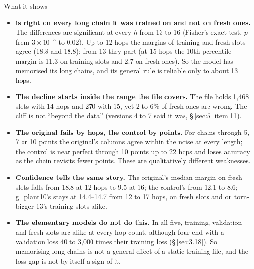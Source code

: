 \documentclass[paper=a4,fontsize=11pt,DIV=11,parskip=half,headings=small,numbers=noendperiod]{scrartcl}
\DeclareRobustCommand{\lead}[1]{\textsf{\bfseries\color{accent}#1}}
\DeclareRobustCommand{\code}[1]{{\fontseries{m}\ttfamily #1}}
\begin{document}
\begin{findbox}{What it shows}
\begin{itemize}
\item \lead{\code{torn-\allowbreak{}bigger-\allowbreak{}13} is right on every long chain it was trained on and
  not on fresh ones.} The differences are significant at every $h$ from 13 to 16 (Fisher’s exact test, $p$ from
  $3\times10^{-5}$ to 0.02). Up to 12 hops the margins of training and fresh slots agree (18.8 and 18.8); from
  13 they part (at 15 hops the 10th-percentile margin is 11.3 on training slots and 2.7 on fresh ones). So the
  model has memorised its long chains, and its general rule is reliable only to about 13 hops.
\item \lead{The decline starts inside the range the file covers.} The file holds 1,468 slots with 14 hops and
  270 with 15, yet 2 to 6\% of fresh ones are wrong. The cliff is not “beyond the data” (versions 4 to 7 said it
  was, \S\,\ref{sec:5} item 11).
\item \lead{The original fails by hops, the control by points.} For chains through 5, 7 or 10 points the
  original’s columns agree within the noise at every length; the control is near perfect through 10 points up to
  22 hops and loses accuracy as the chain revisits fewer points. These are qualitatively different weaknesses.
\item \lead{Confidence tells the same story.} The original’s median margin on fresh slots falls from 18.8 at 12
  hops to 9.5 at 16; the control’s from 12.1 to 8.6; \code{g\_\allowbreak{}plant10}’s stays at 14.4–14.7 from 12
  to 17 hops, on fresh slots and on \code{torn-\allowbreak{}bigger-\allowbreak{}13}’s training slots alike.
\item \lead{The elementary models do not do this.} In all five, training, validation and fresh slots are alike
  at every hop count, although four end with a validation loss 40 to 3,000 times their training loss
  (\S\,\ref{sec:3.18}). So memorising long chains is not a general effect of a static training file, and the
  loss gap is not by itself a sign of it.
\end{itemize}
\end{findbox}
\end{document}
